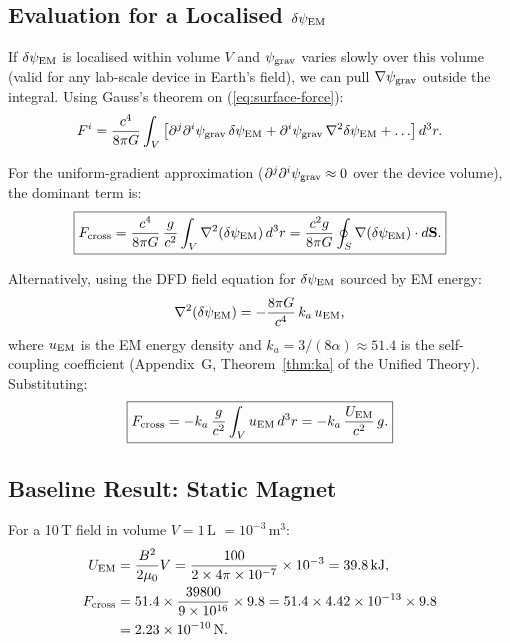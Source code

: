 \documentclass[11pt]{article}
\newcommand{\ka}{k_a}
\begin{document}
\subsection{Evaluation for a Localised $\delta\psi_{\rm EM}$}

If $\delta\psi_{\rm EM}$ is localised within volume $V$ and $\psi_{\rm grav}$
varies slowly over this volume (valid for any lab-scale device in Earth's
field), we can pull $\nabla\psi_{\rm grav}$ outside the integral.
Using Gauss's theorem on (\ref{eq:surface-force}):
\begin{equation}\label{eq:volume-force}
F^i = \frac{c^4}{8\pi G}\int_V \left[
  \partial^j\partial^i\psi_{\rm grav}\,\delta\psi_{\rm EM}
  + \partial^i\psi_{\rm grav}\,\nabla^2\delta\psi_{\rm EM}
  + \ldots
\right] d^3r.
\end{equation}

For the uniform-gradient approximation ($\partial^j\partial^i\psi_{\rm grav}
\approx 0$ over the device volume), the dominant term is:
\begin{equation}\label{eq:force-simplified}
\boxed{
F_{\rm cross} = \frac{c^4}{8\pi G}\,\frac{g}{c^2}
  \int_V \nabla^2(\delta\psi_{\rm EM})\,d^3r
  = \frac{c^2 g}{8\pi G}\oint_S \nabla(\delta\psi_{\rm EM})\cdot d\mathbf{S}.
}
\end{equation}

Alternatively, using the DFD field equation for $\delta\psi_{\rm EM}$
sourced by EM energy:
\begin{equation}
\nabla^2(\delta\psi_{\rm EM}) = -\frac{8\pi G}{c^4}\,\ka\,u_{\rm EM},
\end{equation}
where $u_{\rm EM}$ is the EM energy density and
$\ka = 3/(8\alpha) \approx 51.4$ is the self-coupling coefficient
(Appendix~G, Theorem~\ref{thm:ka} of the Unified Theory). Substituting:
\begin{equation}\label{eq:force-ka}
\boxed{
F_{\rm cross} = -\ka\,\frac{g}{c^2}\int_V u_{\rm EM}\,d^3r
  = -\ka\,\frac{U_{\rm EM}}{c^2}\,g.
}
\end{equation}

\subsection{Baseline Result: Static Magnet}

For a 10\,T field in volume $V = 1$\,L $= 10^{-3}$\,m$^3$:
\begin{align}
U_{\rm EM} &= \frac{B^2}{2\mu_0}V
  = \frac{100}{2 \times 4\pi \times 10^{-7}} \times 10^{-3}
  = 39.8\,\text{kJ}, \\
F_{\rm cross} &= 51.4 \times \frac{39800}{9 \times 10^{16}} \times 9.8
  = 51.4 \times 4.42 \times 10^{-13} \times 9.8 \\
  &= 2.23 \times 10^{-10}\,\text{N}.
\end{align}
\end{document}
